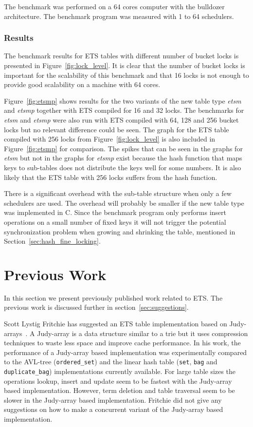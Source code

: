 \documentclass[aps,pre,preprint,nofootinbib]{revtex4}
\begin{document}
The benchmark was performed on a 64 cores computer with the bulldozer architecture.
The benchmark program was measured with 1 to 64 schedulers. 

\subsubsection{Results}

The benchmark results for ETS tables with different number of bucket locks is presented in Figure~\ref{fig:lock_level}.
It is clear that the number of bucket locks is important for the scalability of this benchmark and that 16 locks is not enough to provide good scalability on a machine with 64 cores.

Figure~\ref{fig:etsmp} shows results for the two variants of the new table type \emph{etsm} and \emph{etsmp} together with ETS compiled for 16 and 32 locks.
The benchmarks for \emph{etsm} and \emph{etsmp} were also run with ETS compiled with 64, 128 and 256 bucket locks but no relevant difference could be seen.
The graph for the ETS table compiled with 256 locks from Figure~\ref{fig:lock_level} is also included in Figure~\ref{fig:etsmp} for comparison.
The spikes that can be seen in the graphs for \emph{etsm} but not in the graphs for \emph{etsmp} exist because the hash function that maps keys to sub-tables does not distribute the keys well for some numbers.
It is also likely that the ETS table with 256 locks suffers from the hash function.

There is a significant overhead with the sub-table structure when only a few schedulers are used.
The overhead will probably be smaller if the new table type was implemented in C.
Since the benchmark program only performs insert operations on a small number of fixed keys it will not trigger the potential synchronization problem when growing and shrinking the table, mentioned in Section~\ref{sec:hash_fine_locking}.       


\section{Previous Work}\label{sec:previous_work}

In this section we present previously published work related to ETS. 
The previous work is discussed further in section~\ref{sec:suggestions}.

Scott Lystig Fritchie has suggested an ETS table implementation based on Judy-arrays~\cite{ScottEtsJudy}.
A Judy-array is a data structure similar to a trie but it uses compression techniques to waste less space and improve cache performance.
In his work, the performance of a Judy-array based implementation was experimentally compared to the AVL-tree (\verb|ordered_set|) and the linear hash table (\verb|set|, \verb|bag| and \verb|duplicate_bag|) implementations currently available.
For large table sizes the operations lookup, insert and update seem to be fastest with the Judy-array based implementation.
However, term deletion and table traversal seem to be slower in the Judy-array based implementation.
Fritchie did not give any suggestions on how to make a concurrent variant of the Judy-array based implementation.
\end{document}
